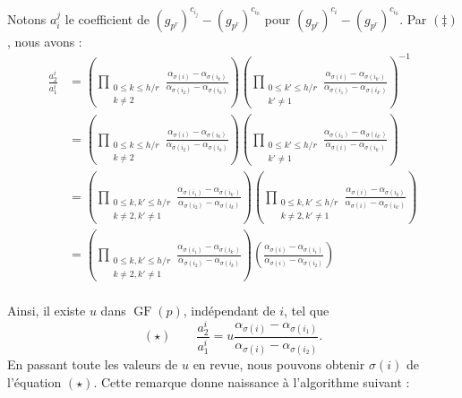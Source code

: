 \documentclass[a4paper, titlepage]{article}
\theoremstyle{definition}
\theoremstyle{remark}
\def\gf{\operatorname{GF}}
\begin{document}
Notons $a_i^j$ le coefficient de $(g_{p^r})^{c_{i_{j}}} - (g_{p^r})^{c_{i_0}}$ pour $(g_{p^r})^{c_{i}} - (g_{p^r})^{c_{i_0}}$. Par $(\ddagger)$, nous avons :
\begin{align*}
\frac{a_2^i}{a_1^i} &= \left(\prod_{\substack{0\leqslant k\leqslant h/r \\ k \neq 2}} \frac{\alpha_{\sigma(i)}-\alpha_{\sigma(i_k)}}{\alpha_{\sigma(i_2)}-\alpha_{\sigma(i_k)}} \right)\left(\prod_{\substack{0\leqslant k'\leqslant h/r \\ k' \neq 1}} \frac{\alpha_{\sigma(i)}-\alpha_{\sigma(i_{k'})}}{\alpha_{\sigma(i_1)}-\alpha_{\sigma(i_{k'})}} \right)^{-1} \\
&= \left(\prod_{\substack{0\leqslant k\leqslant h/r \\ k \neq 2}} \frac{\alpha_{\sigma(i)}-\alpha_{\sigma(i_k)}}{\alpha_{\sigma(i_2)}-\alpha_{\sigma(i_k)}} \right)\left(\prod_{\substack{0\leqslant k' \leqslant h/r \\ k' \neq 1}} \frac{\alpha_{\sigma(i_1)}-\alpha_{\sigma(i_{k'})}}{\alpha_{\sigma(i)}-\alpha_{\sigma(i_{k'})}} \right) \\
&= \left(\prod_{\substack{0\leqslant k, k'\leqslant h/r \\ k \neq 2, k' \neq 1}} \frac{\alpha_{\sigma(i_1)}-\alpha_{\sigma(i_{k'})}}{\alpha_{\sigma(i_2)}-\alpha_{\sigma(i_k)}} \right) \left(\prod_{\substack{0\leqslant k, k'\leqslant h/r \\ k \neq 2, k' \neq 1}} \frac{\alpha_{\sigma(i)}-\alpha_{\sigma(i_k)}}{\alpha_{\sigma(i)}-\alpha_{\sigma(i_{k'})}} \right) \\
&= \left(\prod_{\substack{0\leqslant k, k'\leqslant h/r \\ k \neq 2, k' \neq 1}} \frac{\alpha_{\sigma(i_1)}-\alpha_{\sigma(i_{k'})}}{\alpha_{\sigma(i_2)}-\alpha_{\sigma(i_k)}} \right) \left(\frac{\alpha_{\sigma(i)}-\alpha_{\sigma(i_1)}}{\alpha_{\sigma(i)}-\alpha_{\sigma(i_2)}} \right) \\
\end{align*}

Ainsi, il existe $u$ dans $\gf(p)$, indépendant de $i$, tel que 
$$(\star) \qquad\frac{a_2^i}{a_1^i} = u \frac{\alpha_{\sigma(i)}-\alpha_{\sigma(i_1)}}{\alpha_{\sigma(i)}-\alpha_{\sigma(i_2)}}.$$
En passant toute les valeurs de $u$ en revue, nous pouvons obtenir $\sigma(i)$ de l'équation $(\star)$. Cette remarque donne naissance à l'algorithme suivant :
\end{document}
